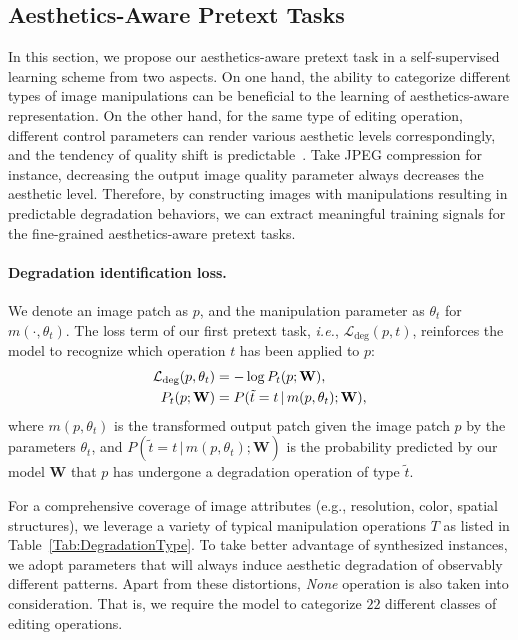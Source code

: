 \documentclass[letterpaper]{article}
\newcommand{\patch}{p}
\newcommand{\transformation}{t}
\newcommand{\params}{\theta} %
\newcommand{\transformations}{T}
\newcommand{\model}{\mathbf{W}}
\newcommand{\loss}{\mathcal{L}}
\newcommand{\degradationloss}{\loss_{\mathrm{deg}}}
\begin{document}
\subsection{Aesthetics-Aware Pretext Tasks}
In this section, we propose our aesthetics-aware pretext task in a self-supervised learning scheme from two aspects.
On one hand, the ability to categorize different types of image manipulations can be beneficial to the learning of aesthetics-aware representation.
On the other hand, for the same type of editing operation, different control parameters can render various aesthetic levels correspondingly, and the tendency of quality shift is predictable~\cite{marchesotti2015discovering}.
Take JPEG compression for instance, decreasing the output image quality parameter always decreases the aesthetic level.
Therefore, by constructing images with manipulations resulting in predictable degradation behaviors, we can extract meaningful training signals for the fine-grained aesthetics-aware pretext tasks.

\paragraph{Degradation identification loss.}
We denote an image patch as $\patch$, and the manipulation parameter as $\params_{\transformation}$ for $m(\cdot, \params_{\transformation})$.
The loss term of our first pretext task, \emph{i.e.}, $\degradationloss(\patch, \transformation)$, reinforces the model to recognize which operation $t$ has been applied to $\patch$:
\begin{equation}
    \centering
    \begin{split}
        \degradationloss(\patch, \params_{\transformation}) &= - \log P_{\transformation}(\patch; \model), \\
        P_{\transformation}(\patch; \model) &= P(\tilde{\transformation} = \transformation \, | \, m(\patch, \params_{\transformation}); \model),
    \end{split}
    \label{equ:L_deg}
\end{equation}
where $m(\patch, \params_{\transformation})$ is the transformed output patch given the image patch $\patch$ by the parameters $\params_{\transformation}$, and $P(\tilde{\transformation} = \transformation \, | \, m(\patch, \params_{\transformation}); \model)$ is the probability predicted by our model $\model$ that $p$ has undergone a degradation operation of type $\tilde{\transformation}$.

For a comprehensive coverage of image attributes (e.g., resolution, color, spatial structures), we leverage a variety of typical manipulation operations $\transformations$ as listed in Table~\ref{Tab:DegradationType}.
To take better advantage of synthesized instances, we adopt parameters that will always induce aesthetic degradation of observably different patterns.
Apart from these distortions, \textit{None} operation is also taken into consideration.
That is, we require the model to categorize $22$ different classes of editing operations.
\end{document}
